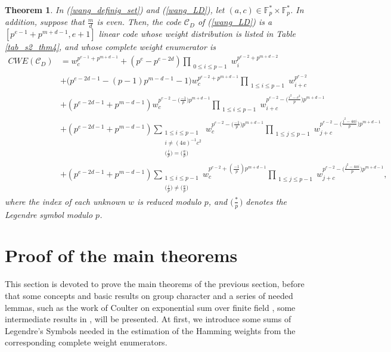 \documentclass[final,1p,times]{elsarticle}
\newtheorem{sec2_thm4}[sec2_thm1]{Theorem}
\begin{document}
   \begin{sec2_thm4}\label{s2_thm4}
     In (\ref{wang_definig_set}) and (\ref{wang_LD}), let $ (a,c)\in \mathbb{F}_{p}^{*}\times \mathbb{F}_{p}^{*} $. In addition, suppose that $ \frac{m}{d} $ is even. Then, the code $ \mathcal{C}_{D} $ of (\ref{wang_LD}) is a $ [p^{e-1}+p^{m+d-1},e+1] $ linear code whose weight distribution is listed in Table \ref{tab_s2_thm4}, and whose complete weight enumerator is 
     \begin{equation}\label{Fac5Even}
       \begin{split}
       \mathit{CWE}(\mathcal{C}_{D})&=w_{c}^{p^{e-1}+p^{m+d-1}}+(p^{e}-p^{e-2d})\prod_{\substack{0\leq i\leq p-1}}w_{i}^{p^{e-2}+p^{m+d-2}}\\
       &+\bigl(p^{e-2d-1}-(p-1)p^{m-d-1}-1\bigr)w_{c}^{p^{e-2}+p^{m+d-1}}\prod_{\substack{1\leq i\leq p-1}}w_{i+c}^{p^{e-2}}\\
       &+(p^{e-2d-1}+p^{m-d-1})w_{c}^{p^{e-2}-\bigl(\frac{-1}{p}\bigr)p^{m+d-1}}\prod_{\substack{1\leq i\leq p-1}}w_{i+c}^{p^{e-2}-\bigl(\frac{i^{2}-c^{2}}{p}\bigr)p^{m+d-1}}\\
       &+(p^{e-2d-1}+p^{m-d-1})\sum_{\substack{1\leq i\leq p-1\\i\ne (4a)^{-1}c^{2}\\\bigl(\frac{i}{p}\bigr)=\bigl(\frac{a}{p}\bigr)}}w_{c}^{p^{e-2}-\bigl(\frac{-1}{p}\bigr)p^{m+d-1}}
       \prod_{\substack{1\leq j\leq p-1}}w_{j+c}^{p^{e-2}-\bigl(\frac{j^{2}-4ai}{p}\bigr)p^{m+d-1}}\\
       &+(p^{e-2d-1}+p^{m-d-1})\sum_{\substack{1\leq i\leq p-1\\\bigl(\frac{i}{p}\bigr)\ne \bigl(\frac{a}{p}\bigr)}} w_{c}^{p^{e-2}+(\frac{-1}{p})p^{m+d-1}}
        \prod_{\substack{1\leq j\leq p-1}}w_{j+c}^{p^{e-2}-\bigl(\frac{j^{2}-4ai}{p}\bigr)p^{m+d-1}},
        \end{split}
       \end{equation}
     where the index of each unknown $ w $ is reduced modulo $ p $, and $ \bigl(\frac{*}{p}\bigr) $ denotes the Legendre symbol modulo $ p $.
    \end{sec2_thm4}



   \section{Proof of the main theorems}
   
   This section is devoted to prove the main theorems of the previous section, before that some concepts and basic results on group character and a series of needed lemmas, such as the work of Coulter on exponential sum over finite field \cite{Bib9,Bib10}, some intermediate results in \cite{Bib7}, will be presented. At first, we introduce some sums of Legendre's Symbols needed in the estimation of the Hamming weights from the corresponding complete weight enumerators.
   
\end{document}
